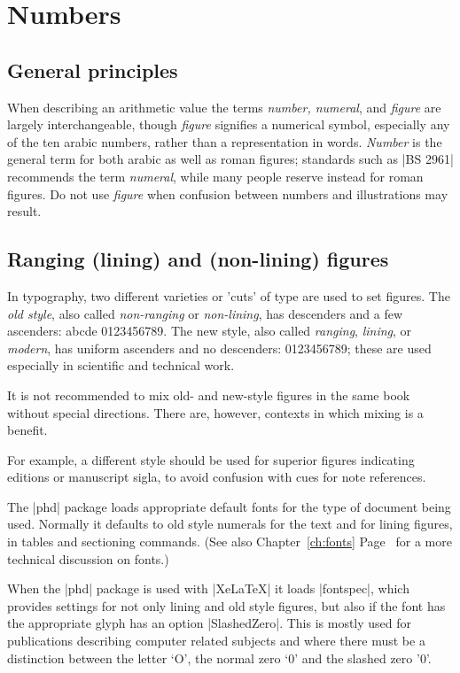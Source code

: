 \chapter{Numbers}
\label{ch:numbers}

\section{General principles}

When describing an arithmetic value the terms \textit{number, numeral}, and \textit{figure} are largely interchangeable, though \textit{figure} signifies a numerical symbol, especially any of the ten arabic numbers, rather than a representation in words. \textit{Number} is the general term for both arabic as well as roman figures; standards such as |BS 2961| recommends the term \textit{numeral}, while many people reserve instead for roman figures. Do not use \textit{figure} when confusion between numbers and illustrations may result.

\section{Ranging (lining) and (non-lining) figures }

In typography, two different varieties or 'cuts' of type are used to set
figures. The \emph{old style}, also called \emph{non-ranging} or \emph{non-lining}, has descenders
and a few ascenders: \bgroup{}
abcde 0123456789\egroup. The new style, also called \emph{ranging},
\emph{lining}, or \emph{modern}, has uniform ascenders and no descenders: 0123456789; these are used especially in scientific and technical work.

It is not recommended to mix old- and new-style figures in the same book without special
directions. There are, however, contexts in which mixing is a benefit.

For example, a different style should be used for superior figures indicating
editions or manuscript sigla, to avoid confusion with cues for
note references.

The |phd| package loads appropriate default fonts for the type of document being used. Normally it defaults to old style numerals for the text and for lining figures, in tables and sectioning commands. (See also Chapter~\ref{ch:fonts}  Page~\pageref{ch:fonts} for a more technical discussion on fonts.) 

When the |phd| package is used with |XeLaTeX| it loads |fontspec|, which provides settings for not only lining and old style figures, but also if the font has the appropriate glyph has an option |SlashedZero|. This is mostly used for publications describing computer related subjects and where there must be a distinction between the letter `O', the normal zero `0' and the slashed zero \ifxetex\bgroup{}'0'\egroup\fi. 

